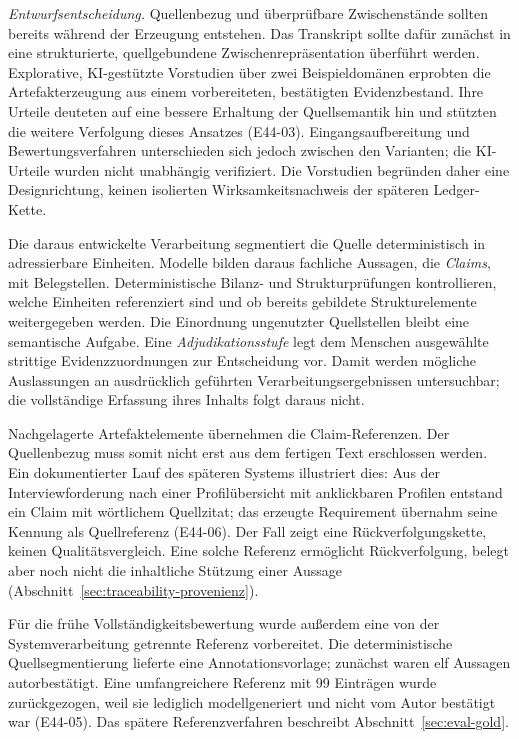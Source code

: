 \emph{Entwurfsentscheidung.} Quellenbezug und überprüfbare
Zwischenstände sollten bereits während der Erzeugung entstehen.
Das Transkript sollte dafür zunächst in eine strukturierte,
quellgebundene Zwischenrepräsentation überführt werden. Explorative,
KI-gestützte Vorstudien über zwei Beispieldomänen erprobten die
Artefakterzeugung aus einem vorbereiteten, bestätigten Evidenzbestand.
Ihre Urteile deuteten auf eine bessere Erhaltung der Quellsemantik
hin und stützten die weitere Verfolgung dieses Ansatzes (E44-03).
Eingangsaufbereitung und Bewertungsverfahren unterschieden sich
jedoch zwischen den Varianten; die KI-Urteile wurden nicht unabhängig
verifiziert. Die Vorstudien begründen daher eine Designrichtung,
keinen isolierten Wirksamkeitsnachweis der späteren Ledger-Kette.

Die daraus entwickelte Verarbeitung segmentiert die Quelle
deterministisch in adressierbare Einheiten. Modelle bilden daraus
fachliche Aussagen, die \emph{Claims}, mit Belegstellen.
Deterministische Bilanz- und Strukturprüfungen kontrollieren,
welche Einheiten referenziert sind und ob bereits gebildete
Strukturelemente weitergegeben werden. Die Einordnung ungenutzter
Quellstellen bleibt eine semantische Aufgabe. Eine
\emph{Adjudikationsstufe} legt dem Menschen ausgewählte strittige
Evidenzzuordnungen zur Entscheidung vor. Damit werden mögliche
Auslassungen an ausdrücklich geführten Verarbeitungsergebnissen
untersuchbar; die vollständige Erfassung ihres Inhalts folgt daraus
nicht.

Nachgelagerte Artefaktelemente übernehmen die Claim-Referenzen.
Der Quellenbezug muss somit nicht erst aus dem fertigen Text
erschlossen werden. Ein dokumentierter Lauf des späteren Systems
illustriert dies: Aus der Interviewforderung nach einer
Profilübersicht mit anklickbaren Profilen entstand ein Claim mit
wörtlichem Quellzitat; das erzeugte Requirement übernahm seine
Kennung als Quellreferenz (E44-06). Der Fall zeigt eine
Rückverfolgungskette, keinen Qualitätsvergleich. Eine solche Referenz
ermöglicht Rückverfolgung, belegt aber noch nicht die inhaltliche
Stützung einer Aussage
(Abschnitt~\ref{sec:traceability-provenienz}).

Für die frühe Vollständigkeitsbewertung wurde außerdem eine von der
Systemverarbeitung getrennte Referenz vorbereitet. Die deterministische
Quellsegmentierung lieferte eine Annotationsvorlage; zunächst waren
elf Aussagen autorbestätigt. Eine umfangreichere Referenz mit
99 Einträgen wurde zurückgezogen, weil sie lediglich modellgeneriert
und nicht vom Autor bestätigt war (E44-05). Das spätere
Referenzverfahren beschreibt Abschnitt~\ref{sec:eval-gold}.

